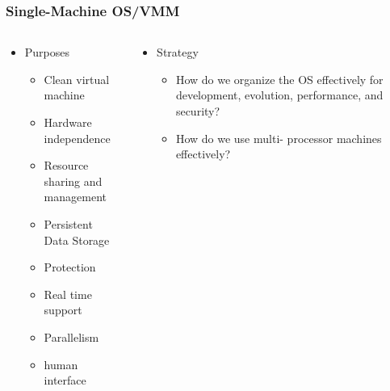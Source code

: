 \begin{frame}[plain,t]
	\frametitle{Single-Machine OS/VMM}
	\begin{columns}[t]
		\begin{column}{.5\textwidth}
			
			\begin{itemize}\Large
				\item Purposes
				\begin{itemize}\large
					\item Clean virtual machine
					\item Hardware independence
					\item Resource sharing and management
					\item Persistent Data Storage
					\item Protection
					\item Real time support
					\item Parallelism
					\item human interface
					
				\end{itemize}
			\end{itemize}
			
		\end{column}\pause
		
		\begin{column}{.5\textwidth}
			
			\begin{itemize}\Large
				\item Strategy
				\begin{itemize}\large
					\item How do we organize the OS
					effectively for development,
					evolution, performance,
					and security?
					\item How do we use multi-
					processor machines
					effectively?
					
				\end{itemize}
			\end{itemize}
			
		\end{column}
	\end{columns}
\end{frame}


